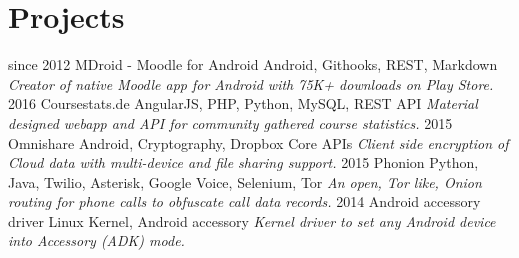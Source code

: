 \documentclass[]{friggeri-cv}
\begin{document}
\section{Projects}
\begin{entrylist}
  \entry
    {since 2012}
    {MDroid - Moodle for Android}
    {Android, Githooks, REST, Markdown}
    {\emph{Creator of native Moodle app for Android with 75K+ downloads on Play Store.}}
  \entry
    {2016}
    {Coursestats.de}
    {AngularJS, PHP, Python, MySQL, REST API}
    {\emph{Material designed webapp and API for community gathered course statistics.}}
  \entry
    {2015}
    {Omnishare}
    {Android, Cryptography, Dropbox Core APIs}
    {\emph{Client side encryption of Cloud data with multi-device and file sharing support.}}
  \entry
    {2015}
    {Phonion}
    {Python, Java, Twilio, Asterisk, Google Voice, Selenium, Tor}
    {\emph{An open, Tor like, Onion routing for phone calls to obfuscate call data records.}}
  \entry
    {2014}
    {Android accessory driver}
    {Linux Kernel, Android accessory}
    {\emph{Kernel driver to set any Android device into Accessory (ADK) mode.}}
\end{entrylist}
\end{document}

